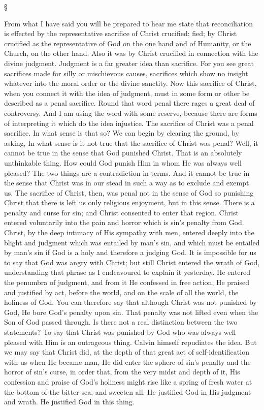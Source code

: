 \documentclass[12pt,letterpaper,oneside]{book}
\begin{document}
\begin{center}
\S
\end{center}

From what I have said you will be prepared 
to hear me state that reconciliation is effected 
by the representative sacrifice of Christ crucified;
fied; by Christ crucified as the representative of 
God on the one hand and of Humanity, or the 
Church, on the other hand. Also it was by 
Christ crucified in connection with the divine 
judgment. Judgment is a far greater idea than 
sacrifice. For you see great sacrifices made for 
silly or mischievous causes, sacrifices which show 
no insight whatever into the moral order or the 
divine sanctity. Now this sacrifice of Christ, 
when you connect it with the idea of judgment, 
must in some form or other be described as a 
penal sacrifice. Round that word penal there 
rages a great deal of controversy. And I am 
using the word with some reserve, because there 
are forms of interpreting it which do the idea 
injustice. The sacrifice of Christ was a penal 
sacrifice. In what sense is that so? We can 
begin by clearing the ground, by asking, In 
what sense is it not true that the sacrifice of 
Christ was penal? Well, it cannot be true in 
the sense that God punished Christ. That is an 
absolutely unthinkable thing. How could God 
punish Him in whom He was always well 
pleased? The two things are a contradiction 
in terms. And it cannot be true in the sense 
that Christ was in our stead in such a way as 
to exclude and exempt us. The sacrifice of 
Christ, then, was penal not in the sense of God 
so punishing Christ that there is left us only 
religious enjoyment, but in this sense. There is 
a penalty and curse for sin; and Christ consented 
to enter that region. Christ entered voluntarily 
into the pain and horror which is sin's penalty 
from God. Christ, by the deep intimacy of His 
sympathy with men, entered deeply into the 
blight and judgment which was entailed by 
man's sin, and which must be entailed by man's 
sin if God is a holy and therefore a judging 
God. It is impossible for us to say that God 
was angry with Christ; but still Christ entered 
the wrath of God, understanding that phrase 
as I endeavoured to explain it yesterday. He 
entered the penumbra of judgment, and from 
it He confessed in free action, He praised and 
justified by act, before the world, and on the 
scale of all the world, the holiness of God. You 
can therefore say that although Christ was not 
punished by God, He bore God's penalty upon 
sin. That penalty was not lifted even when the 
Son of God passed through. Is there not a real 
distinction between the two statements? To 
say that Christ was punished by God who was 
always well pleased with Him is an outrageous 
thing. Calvin himself repudiates the idea. But 
we may say that Christ did, at the depth of that 
great act of self-identification with us when He 
became man, He did enter the sphere of sin's 
penalty and the horror of sin's curse, in order 
that, from the very midst and depth of it, His 
confession and praise of God's holiness might 
rise like a spring of fresh water at the bottom 
of the bitter sea, and sweeten all. He justified 
God in His judgment and wrath. He justified 
God in this thing. 
\end{document}

